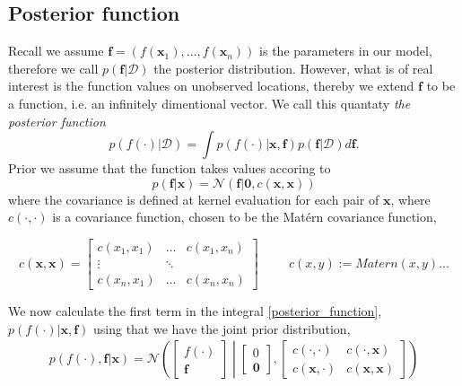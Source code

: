 \subsection*{Posterior function}
Recall we assume $\textbf{f} = (f(\textbf{x}_1), \dots, f(\textbf{x}_n))$ is the parameters in 
our model, therefore we call $p(\textbf{f}|\mathcal{D})$ the posterior distribution. However, 
what is of real interest is the function values on unobserved locations, thereby we 
extend $\textbf{f}$ to be a function, i.e. an infinitely dimentional vector. We call this 
quantaty \textit{the posterior function} 
\begin{equation}\label{posterior_function}
    p(f(\cdot)|\mathcal{D})= \int p(f(\cdot)|\textbf{x}, \textbf{f})p(\textbf{f}|\mathcal{D})d\textbf{f}.
\end{equation}
Prior we assume that the function takes values accoring to
$$p(\textbf{f}|\textbf{x}) = \mathcal{N}(\textbf{f}|\textbf{0}, c(\textbf{x}, \textbf{x}))$$
where the covariance is defined at kernel evaluation for each pair of $\textbf{x}$,
where $c(\cdot, \cdot)$ is a covariance function, chosen to be the Matérn covariance function,

  $$c(\textbf{x}, \textbf{x}) = \begin{bmatrix}
    c(x_1,x_1) & \dots & c(x_1,x_n)\\
    \vdots& \ddots\\
    c(x_n,x_1) & \dots & c(x_n,x_n)
\end{bmatrix}\hspace{1cm} c(x, y) := Matern(x,y)...$$ 

We now calculate the first term in the integral \eqref{posterior_function}, 
$p(f(\cdot)|\textbf{x}, \textbf{f})$ using that we have the joint prior 
distribution, 
\begin{align}
    p(f(\cdot),\textbf{f}|\textbf{x}) = \mathcal{N}\left(\begin{bmatrix}
        f(\cdot)\\ \textbf{f}
    \end{bmatrix} \middle| \begin{bmatrix}
        0\\ \textbf{0}
    \end{bmatrix}, \begin{bmatrix}
        c(\cdot, \cdot) & c(\cdot,\textbf{x})\\
        c(\textbf{x}, \cdot) & c(\textbf{x}, \textbf{x})
    \end{bmatrix} \right)
\end{align}

